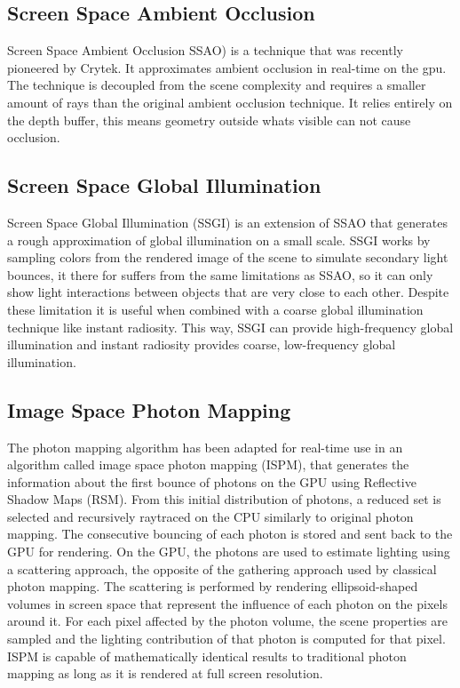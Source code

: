     \subsection {Screen Space Ambient Occlusion}  
		Screen Space Ambient Occlusion SSAO) is a technique that was recently pioneered
		by Crytek. It approximates ambient occlusion in real-time on the gpu. The
		technique is decoupled from the scene complexity and requires a smaller amount
		of rays than the original ambient occlusion technique. It relies entirely on the
		depth buffer, this means geometry outside whats visible can not cause occlusion.

	\subsection {Screen Space Global Illumination}
        Screen Space Global Illumination (SSGI) is an extension of SSAO that generates a rough approximation of global illumination on a small scale. SSGI works by sampling colors from the rendered image of the scene to simulate secondary light bounces, it there for suffers from the same limitations as SSAO, so it can only show light interactions between objects that are very close to each other. Despite these limitation it is useful when combined with a coarse global illumination technique like instant radiosity. This way, SSGI can provide high-frequency global illumination and instant radiosity provides coarse, low-frequency global illumination.

	\subsection {Image Space Photon Mapping}
		The photon mapping algorithm has been adapted for real-time use in an algorithm called image space photon mapping (ISPM), that generates the information about the first bounce of photons on the GPU using Reflective Shadow Maps (RSM). \cite{dachsbacher2005} 
		From this initial distribution of photons, a reduced set is selected and recursively raytraced on the CPU similarly to original photon mapping. The consecutive bouncing of each photon is stored and sent back to the GPU for rendering. On the GPU, the photons are used to estimate lighting using a scattering approach, the opposite of the gathering approach used by classical photon mapping. The scattering is performed by rendering ellipsoid-shaped volumes in screen space that represent the influence of each photon on the pixels around it. For each pixel affected by the photon volume, the scene properties are sampled and the lighting contribution of that photon is computed for that pixel. ISPM is capable of mathematically identical results to traditional photon mapping as long as it is rendered at full screen resolution.

